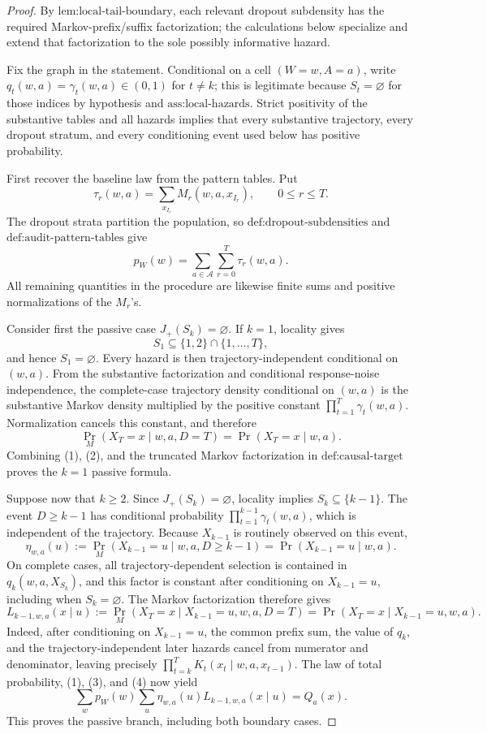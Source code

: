 \documentclass{article}
\begin{document}
\begin{proof}
By \(\text{lem:local-tail-boundary}\), each relevant dropout subdensity has the required Markov-prefix/suffix factorization; the calculations below specialize and extend that factorization to the sole possibly informative hazard.

Fix the graph in the statement.  Conditional on a cell \((W=w,A=a)\), write
\(q_t(w,a)=\gamma_t(w,a)\in(0,1)\) for \(t\ne k\); this is legitimate because \(S_t=\varnothing\) for those indices by hypothesis and \(\text{ass:local-hazards}\).  Strict positivity of the substantive tables and all hazards implies that every substantive trajectory, every dropout stratum, and every conditioning event used below has positive probability.

First recover the baseline law from the pattern tables.  Put
\[
\tau_r(w,a)=\sum_{x_{I_r}}M_r(w,a,x_{I_r}),\qquad 0\le r\le T.
\]
The dropout strata partition the population, so \(\text{def:dropout-subdensities}\) and \(\text{def:audit-pattern-tables}\) give
\[
p_W(w)=\sum_{a\in\mathcal A}\sum_{r=0}^T\tau_r(w,a).
\tag{1}
\]
All remaining quantities in the procedure are likewise finite sums and positive normalizations of the \(M_r\)'s.

Consider first the passive case \(J_+(S_k)=\varnothing\).  If \(k=1\), locality gives
\[
S_1\subseteq\{1,2\}\cap\{1,\ldots,T\},
\]
and hence \(S_1=\varnothing\).  Every hazard is then trajectory-independent conditional on \((w,a)\).  From the substantive factorization and conditional response-noise independence, the complete-case trajectory density conditional on \((w,a)\) is the substantive Markov density multiplied by the positive constant \(\prod_{t=1}^T\gamma_t(w,a)\).  Normalization cancels this constant, and therefore
\[
\Pr_M(X_T=x\mid w,a,D=T)=
\Pr(X_T=x\mid w,a).
\tag{2}
\]
Combining (1), (2), and the truncated Markov factorization in \(\text{def:causal-target}\) proves the \(k=1\) passive formula.

Suppose now that \(k\ge2\).  Since \(J_+(S_k)=\varnothing\), locality implies
\(S_k\subseteq\{k-1\}\).  The event \(D\ge k-1\) has conditional probability
\(\prod_{t=1}^{k-1}\gamma_t(w,a)\), which is independent of the trajectory.  Because \(X_{k-1}\) is routinely observed on this event,
\[
\eta_{w,a}(u)
:=\Pr_M(X_{k-1}=u\mid w,a,D\ge k-1)
=\Pr(X_{k-1}=u\mid w,a).
\tag{3}
\]
On complete cases, all trajectory-dependent selection is contained in
\(q_k(w,a,X_{S_k})\), and this factor is constant after conditioning on
\(X_{k-1}=u\), including when \(S_k=\varnothing\).  The Markov factorization therefore gives
\[
L_{k-1,w,a}(x\mid u)
:=\Pr_M(X_T=x\mid X_{k-1}=u,w,a,D=T)
=\Pr(X_T=x\mid X_{k-1}=u,w,a).
\tag{4}
\]
Indeed, after conditioning on \(X_{k-1}=u\), the common prefix sum, the value of \(q_k\), and the trajectory-independent later hazards cancel from numerator and denominator, leaving precisely
\(\prod_{t=k}^T K_t(x_t\mid w,a,x_{t-1})\).  The law of total probability, (1), (3), and (4) now yield
\[
\sum_w p_W(w)\sum_u\eta_{w,a}(u)L_{k-1,w,a}(x\mid u)
=Q_a(x).
\tag{5}
\]
This proves the passive branch, including both boundary cases.


\end{proof}
\end{document}
